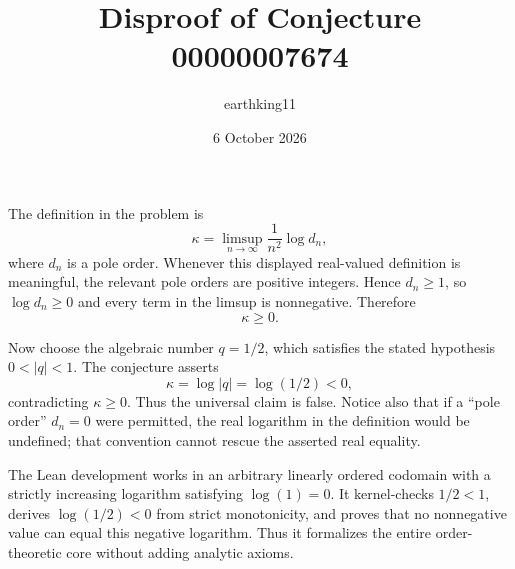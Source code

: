 \documentclass[11pt]{article}
\title{Disproof of Conjecture 00000007674}
\author{earthking11}
\date{6 October 2026}
\begin{document}
\maketitle

The definition in the problem is
\[
 \kappa=\limsup_{n\to\infty}\frac{1}{n^2}\log d_n,
\]
where $d_n$ is a pole order.  Whenever this displayed real-valued definition
is meaningful, the relevant pole orders are positive integers.  Hence
$d_n\ge1$, so $\log d_n\ge0$ and every term in the limsup is nonnegative.
Therefore
\[
 \kappa\ge0.
\]

Now choose the algebraic number $q=1/2$, which satisfies the stated
hypothesis $0<|q|<1$.  The conjecture asserts
\[
 \kappa=\log|q|=\log(1/2)<0,
\]
contradicting $\kappa\ge0$.  Thus the universal claim is false.  Notice also
that if a ``pole order'' $d_n=0$ were permitted, the real logarithm in the
definition would be undefined; that convention cannot rescue the asserted
real equality.

The Lean development works in an arbitrary linearly ordered codomain with a
strictly increasing logarithm satisfying $\log(1)=0$.  It kernel-checks
$1/2<1$, derives $\log(1/2)<0$ from strict monotonicity, and proves that no
nonnegative value can equal this negative logarithm.  Thus it formalizes the
entire order-theoretic core without adding analytic axioms.
\end{document}
